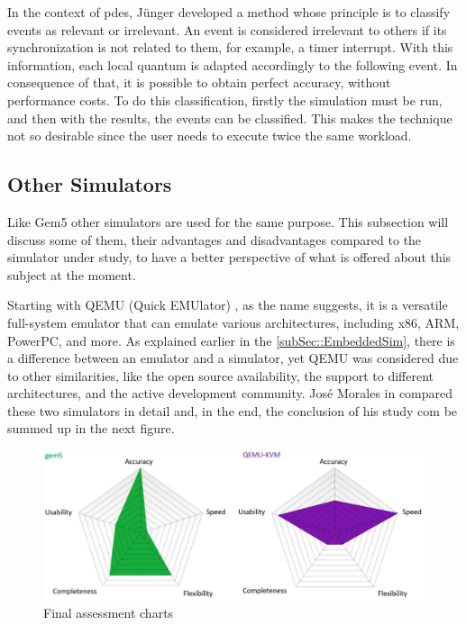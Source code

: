In the context of \gls{pdes}, Jünger developed a method whose principle is to classify events as relevant or irrelevant. An event is considered 
irrelevant to others if its synchronization is not related to them, for example, a timer interrupt. With this information, each local quantum is 
adapted accordingly to the following event. In consequence of that, it is possible to obtain perfect accuracy, without performance costs. To do 
this classification, firstly the simulation must be run, and then with the results, the events can be classified. This makes the technique not so 
desirable since the user needs to execute twice the same workload. 


\subsection{Other Simulators}


Like Gem5 other simulators are used for the same purpose. This subsection will discuss some of them, their advantages and disadvantages 
compared to the simulator under study, to have a better perspective of what is offered about this subject at the moment. 

Starting with QEMU (Quick EMUlator) \cite{theQEMUsimulator}, as the name suggests, it is a versatile full-system emulator that can emulate 
various architectures, including x86, ARM, PowerPC, and more. As explained earlier in the \autoref{subSec::EmbeddedSim}, there is a difference 
between an emulator and a simulator, yet QEMU was considered due to other similarities, like the open source availability, the support to 
different architectures, and the active development community. José Morales in \cite{morales2016evaluating} compared these two simulators in 
detail and, in the end, the conclusion of his study com be summed up in the next figure.

\begin{figure}[H]
	\centering
 	\includegraphics[width=0.8\linewidth]{Images/gem5VSQEMU.png}
 	\caption{Final assessment charts \cite{morales2016evaluating}}
\end{figure}

